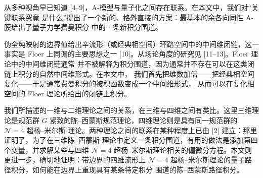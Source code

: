 \documentclass[11pt,a4paper,UTF8]{ctexart}
\theoremstyle{plain}
\theoremstyle{definition}
\newcommand{\R}{\mathbb{R}}
\newcommand{\dd}{\mathrm{d}}
\newcommand{\ee}{\mathrm{e}}
\newcommand{\ii}{\mathrm{i}}
\begin{document}

从多种视角早已知道 [4--9]，A-模型与量子化之间存在联系。在本文中，我们对“关键联系究竟
是什么”提出了一个新的、格外直接的方案：最基本的余各向同性 A-膜给出了量子力学费曼积分
中的一条新积分围道。

伪全纯映射的边界值给出辛流形（或经典相空间）环路空间中的中间维闭链，这一事实是 Floer
上同调的主要思想之一 [10]。从场论角度的研究见 [11--13]。Floer 理论中的中间维闭链通常
并不被解释为积分围道，因为通常并不存在可以在这类闭链上积分的自然中间维形式。在本文中，
我们首先把维数加倍——把经典相空间复化——于是通常费曼积分的被积函数变成一个中间维形式，
从而可以在复化相空间的 Floer 理论所给出的闭链上积分。


我们所描述的一维与二维理论之间的关系，在三维与四维之间有类比。这里三维理论是规范群
$G$ 紧致的陈--西蒙斯规范理论，四维理论则是具有同一规范群的 $\mathcal{N}=4$ 超杨--米尔斯
理论。两种理论之间的联系在某种程度上已由 [2] 建立：那里证明了，为了在三维陈--西蒙斯
理论中定义一条积分围道，有用的做法是添加第四个变量，并求解某些与四维 $\mathcal{N}=4$
超杨--米尔斯理论相关的偏微分方程。本文则更进一步，确切地证明：带边界的四维流形上
$\mathcal{N}=4$ 超杨--米尔斯理论的量子路径积分，如何能在边界上重现具有某条特定积分
围道的陈--西蒙斯路径积分。
\end{document}

